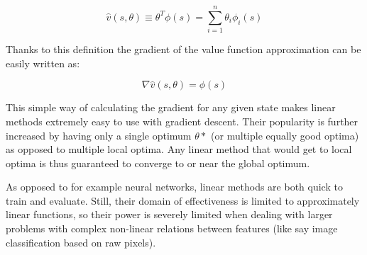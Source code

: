 \begin{equation}
  \hat{v}(s, \theta) \equiv \theta^T \phi(s) = \sum^n_{i=1} \theta_i \phi_i(s)
\end{equation}

Thanks to this definition the gradient of the value function approximation
can be easily written as:

\begin{equation}
  \nabla \hat{v}(s, \theta) = \phi(s)
\end{equation}

This simple way of calculating the gradient
for any given state makes linear methods extremely easy to use with gradient descent.
Their popularity is further increased
by having only a single optimum $\theta*$ (or multiple equally good optima)
as opposed to multiple local optima.
Any linear method that would get to local optima
is thus guaranteed to converge to or near the global optimum.

As opposed to for example neural networks,
linear methods are both quick to train and evaluate.
Still, their domain of effectiveness is limited
to approximately linear functions,
so their power is severely limited when dealing with
larger problems with complex non-linear relations between features
(like say image classification based on raw pixels).
